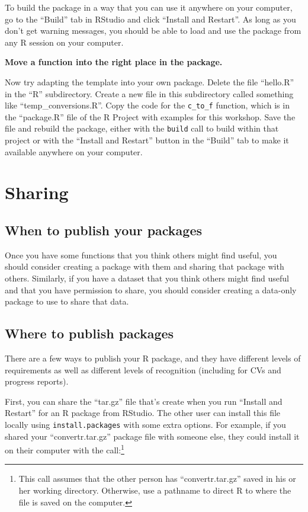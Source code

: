 \documentclass[]{tufte-book}
\begin{document}
To build the package in a way that you can use it anywhere on your computer,
go to the ``Build'' tab in RStudio and click ``Install and Restart''. As long
as you don't get warning messages, you should be able to load and use the
package from any R session on your computer.

\textbf{Move a function into the right place in the package.}

Now try adapting the template into your own package. Delete the file
``hello.R'' in the ``R'' subdirectory. Create a new file in this subdirectory
called something like ``temp\_conversions.R''. Copy the code for the
\texttt{c\_to\_f} function, which is in the ``package.R'' file of the R Project
with examples for this workshop. Save the file and rebuild the package,
either with the \texttt{build} call to build within that project or with the
``Install and Restart'' button in the ``Build'' tab to make it available
anywhere on your computer.

\hypertarget{sharing}{%
\section{Sharing}\label{sharing}}

\hypertarget{when-to-publish-your-packages}{%
\subsection{When to publish your packages}\label{when-to-publish-your-packages}}

Once you have some functions that you think others might find useful, you
should consider creating a package with them and sharing that package with
others. Similarly, if you have a dataset that you think others might
find useful and that you have permission to share, you should consider creating
a data-only package to use to share that data.

\hypertarget{where-to-publish-packages}{%
\subsection{Where to publish packages}\label{where-to-publish-packages}}

There are a few ways to publish your R package, and they have different
levels of requirements as well as different levels of recognition (including
for CVs and progress reports).

First, you can share the ``tar.gz'' file that's create when you run ``Install and Restart''
for an R package from RStudio. The other user can install this file locally using
\texttt{install.packages} with some extra options. For example, if you shared your
``convertr.tar.gz'' package file with someone else, they could install it on their
computer with the call:\footnote{This call assumes that the other person has ``convertr.tar.gz''
  saved in his or her working directory. Otherwise, use a pathname to direct R to where
  the file is saved on the computer.}
\end{document}
